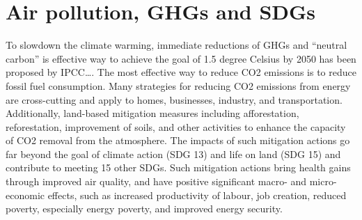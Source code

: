 \section{Air pollution, GHGs and SDGs}

To slowdown the climate warming, immediate reductions of GHGs and “neutral carbon” is effective way to achieve the goal of 1.5 degree Celsius by 2050 has been proposed by IPCC…. The most effective way to reduce CO2 emissions is to reduce fossil fuel consumption. Many strategies for reducing CO2 emissions from energy are cross-cutting and apply to homes, businesses, industry, and transportation. Additionally, land-based mitigation measures including afforestation, reforestation, improvement of soils, and other activities to enhance the capacity of CO2 removal from the atmosphere. The impacts of such mitigation actions go far beyond the goal of climate action (SDG 13) and life on land (SDG 15) and contribute to meeting 15 other SDGs. Such mitigation actions bring health gains through improved air quality, and have positive significant macro- and micro-economic effects, such as increased productivity of labour, job creation, reduced poverty, especially energy poverty, and improved energy security. \par

